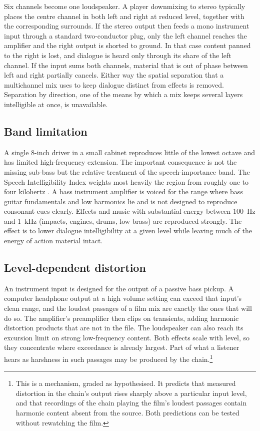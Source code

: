 Six channels become one loudspeaker. A player downmixing to stereo typically places the centre channel in both left and right at reduced level, together with the corresponding surrounds. If the stereo output then feeds a mono instrument input through a standard two-conductor plug, only the left channel reaches the amplifier and the right output is shorted to ground. In that case content panned to the right is lost, and dialogue is heard only through its share of the left channel. If the input sums both channels, material that is out of phase between left and right partially cancels. Either way the spatial separation that a multichannel mix uses to keep dialogue distinct from effects is removed. Separation by direction, one of the means by which a mix keeps several layers intelligible at once, is unavailable.

\subsection{Band limitation}

A single 8-inch driver in a small cabinet reproduces little of the lowest octave and has limited high-frequency extension. The important consequence is not the missing sub-bass but the relative treatment of the speech-importance band. The Speech Intelligibility Index weights most heavily the region from roughly one to four kilohertz \citep{ansi1997}. A bass instrument amplifier is voiced for the range where bass guitar fundamentals and low harmonics lie and is not designed to reproduce consonant cues clearly. Effects and music with substantial energy between 100~Hz and 1~kHz (impacts, engines, drums, low brass) are reproduced strongly. The effect is to lower dialogue intelligibility at a given level while leaving much of the energy of action material intact.

\subsection{Level-dependent distortion}

An instrument input is designed for the output of a passive bass pickup. A computer headphone output at a high volume setting can exceed that input's clean range, and the loudest passages of a film mix are exactly the ones that will do so. The amplifier's preamplifier then clips on transients, adding harmonic distortion products that are not in the file. The loudspeaker can also reach its excursion limit on strong low-frequency content. Both effects scale with level, so they concentrate where exceedance is already largest. Part of what a listener hears as harshness in such passages may be produced by the chain.\footnote{This is a mechanism, graded as hypothesised. It predicts that measured distortion in the chain's output rises sharply above a particular input level, and that recordings of the chain playing the film's loudest passages contain harmonic content absent from the source. Both predictions can be tested without rewatching the film.}

